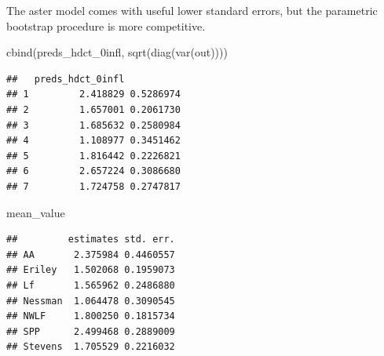 \documentclass[
  ignorenonframetext,
]{beamer}
\newenvironment{Shaded}{\begin{snugshade}}{\end{snugshade}}
\newcommand{\FunctionTok}[1]{\textcolor[rgb]{0.00,0.00,0.00}{#1}}
\newcommand{\NormalTok}[1]{#1}
\begin{document}
\begin{frame}[fragile]{}
\protect\hypertarget{section-47}{}
The aster model comes with useful lower standard errors, but the
parametric bootstrap procedure is more competitive.

\vspace{12pt}
\tiny

\begin{Shaded}
\begin{Highlighting}[]
\FunctionTok{cbind}\NormalTok{(preds\_hdct\_0infl, }\FunctionTok{sqrt}\NormalTok{(}\FunctionTok{diag}\NormalTok{(}\FunctionTok{var}\NormalTok{(out))))}
\end{Highlighting}
\end{Shaded}

\begin{verbatim}
##   preds_hdct_0infl          
## 1         2.418829 0.5286974
## 2         1.657001 0.2061730
## 3         1.685632 0.2580984
## 4         1.108977 0.3451462
## 5         1.816442 0.2226821
## 6         2.657224 0.3086680
## 7         1.724758 0.2747817
\end{verbatim}

\begin{Shaded}
\begin{Highlighting}[]
\NormalTok{mean\_value}
\end{Highlighting}
\end{Shaded}

\begin{verbatim}
##         estimates std. err.
## AA       2.375984 0.4460557
## Eriley   1.502068 0.1959073
## Lf       1.565962 0.2486880
## Nessman  1.064478 0.3090545
## NWLF     1.800250 0.1815734
## SPP      2.499468 0.2889009
## Stevens  1.705529 0.2216032
\end{verbatim}
\end{frame}
\end{document}
